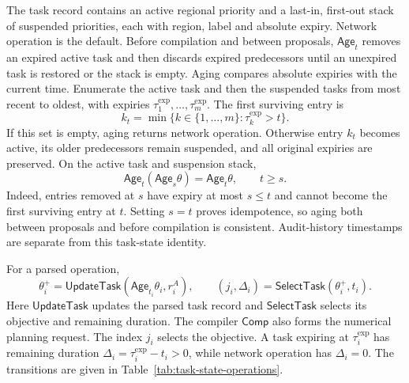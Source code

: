 \documentclass[preprint,12pt]{elsarticle}
\begin{document}
The task record contains an active regional priority and a last-in,
first-out stack of suspended priorities, each with region, label and
absolute expiry. Network operation is the default. Before compilation and
between proposals, $\mathsf{Age}_t$ removes an expired active task and then
discards expired predecessors until an unexpired task is restored or the
stack is empty. Aging compares absolute expiries with the current time. Enumerate the
active task and then the suspended tasks from most recent to oldest, with
expiries $\tau_1^{\mathrm{exp}},\ldots,\tau_m^{\mathrm{exp}}$. The first
surviving entry is
\begin{equation}
k_t=\min\{k\in\{1,\ldots,m\}:\tau_k^{\mathrm{exp}}>t\}.
\label{eq:task-age-survivor}
\end{equation}
If this set is empty, aging returns network operation. Otherwise entry
$k_t$ becomes active, its older predecessors remain suspended, and all
original expiries are preserved. On the active task and suspension stack,
\begin{equation}
\mathsf{Age}_t(\mathsf{Age}_s\theta)=\mathsf{Age}_t\theta,
\qquad t\ge s.
\label{eq:task-age-composition}
\end{equation}
Indeed, entries removed at $s$ have expiry at most $s\le t$ and cannot
become the first surviving entry at $t$. Setting $s=t$ proves idempotence,
so aging both between proposals and before compilation is consistent.
Audit-history timestamps are separate from this task-state identity.

For a parsed operation,
\begin{equation}
\theta_i^+=\mathsf{UpdateTask}(\mathsf{Age}_{t_i}\theta_i,r_i^A),\qquad
(j_i,\Delta_i)=\mathsf{SelectTask}(\theta_i^+,t_i).
\label{eq:task-state-compiler}
\end{equation}
Here $\mathsf{UpdateTask}$ updates the parsed task record and
$\mathsf{SelectTask}$ selects its objective and remaining duration.
The compiler $\mathsf{Comp}$ also forms the numerical planning request.
The index $j_i$ selects the objective. A task expiring at $\tau_i^{\mathrm{exp}}$ has remaining
duration $\Delta_i=\tau_i^{\mathrm{exp}}-t_i>0$, while network operation has $\Delta_i=0$.
The transitions are given in Table~\ref{tab:task-state-operations}.
\end{document}
